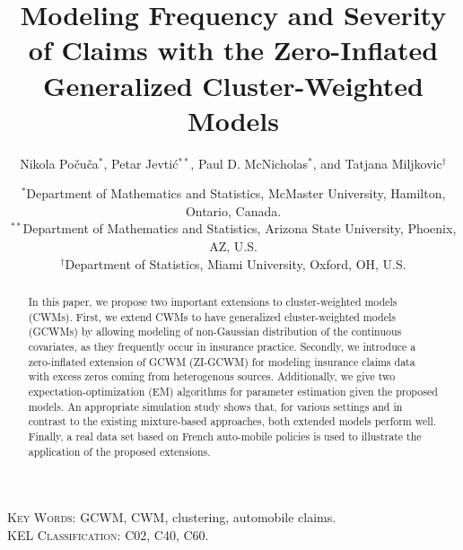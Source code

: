 \documentclass[12pt,letterpaper]{article}
\numberwithin{equation}{section}
\numberwithin{equation}{section}
\numberwithin{equation}{section}
\begin{document}
\title{Modeling  Frequency and Severity of Claims with the Zero-Inflated Generalized  Cluster-Weighted Models}

\author{Nikola Po\v cu\v ca$^*$,  Petar Jevti\' c$^{**}$, Paul D. McNicholas$^*$, and Tatjana Miljkovic$^{\dagger}$}

\date{\small $^*$Department of Mathematics and Statistics, McMaster University, Hamilton, Ontario, Canada.\\
$^{**}$Department of Mathematics and Statistics, Arizona State University, Phoenix, AZ, U.S.\\
$^{\dagger}$Department of Statistics, Miami University, Oxford, OH, U.S.}
\maketitle
\doublespacing
\small

\begin{abstract}

In this paper, we propose two important extensions to cluster-weighted models (CWMs). First, we extend CWMs to have generalized cluster-weighted models (GCWMs) by allowing modeling of non-Gaussian distribution of the continuous covariates, as they frequently occur in insurance practice. Secondly, we introduce a zero-inflated extension of GCWM (ZI-GCWM) for modeling insurance claims data with excess zeros coming from heterogenous sources. Additionally, we give two expectation-optimization (EM) algorithms for parameter estimation given the proposed models. An appropriate simulation study shows that, for various settings and in contrast to the existing mixture-based approaches, both extended models perform well. Finally, a real data set based on French auto-mobile policies is used to illustrate the application of the proposed extensions.

\end{abstract}
\textsc{Key Words:} GCWM, CWM, clustering, automobile claims.\\
\textsc{KEL Classification:}  C02, C40, C60.\\
\end{document}
